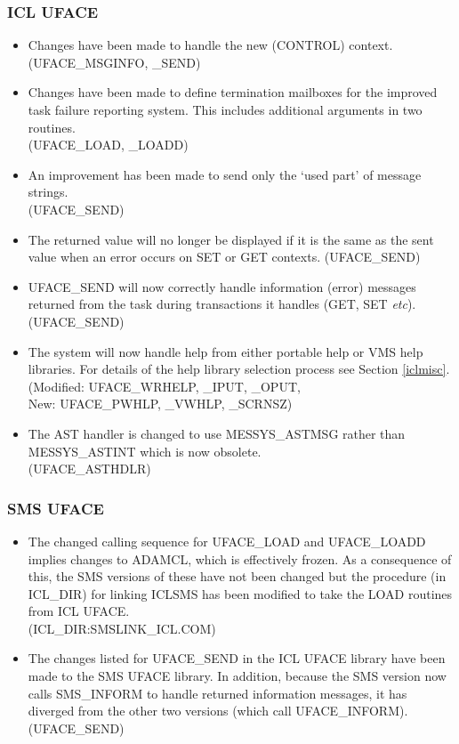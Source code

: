 \subsubsection{ICL UFACE}
\label{uface}
\begin{itemize}
\item Changes have been made to handle the new (CONTROL) context.\\
(UFACE\_MSGINFO, \_SEND)
\item Changes have been made to define termination mailboxes for the improved 
task failure reporting system. This includes additional arguments in two
routines.\\
(UFACE\_LOAD, \_LOADD)
\item An improvement has been made to send only the `used part' of message
strings.\\
(UFACE\_SEND)
\item The returned value will no longer be displayed if it is the same as
the sent value when an error occurs on SET or GET contexts. 
(UFACE\_SEND)
\item UFACE\_SEND will now correctly handle information (error) messages 
returned from the task during transactions it handles (GET, SET {\em etc}).\\
(UFACE\_SEND)
\item The system will now handle help from either portable help or VMS help
libraries. For details of the help library selection process see Section 
\ref{iclmisc}.\\
(Modified: UFACE\_WRHELP, \_IPUT, \_OPUT,\\ 
New: UFACE\_PWHLP, \_VWHLP, \_SCRNSZ)
\item The AST handler is changed to use MESSYS\_ASTMSG rather than 
MESSYS\_ASTINT which is now obsolete.\\
(UFACE\_ASTHDLR)
\end{itemize}
\subsubsection{SMS UFACE}
\begin{itemize}
\item The changed calling sequence for UFACE\_LOAD and UFACE\_LOADD implies
changes to ADAMCL, which is effectively frozen.
As a consequence of this, the SMS versions of these have not been changed but
the procedure (in ICL\_DIR) for linking 
ICLSMS has been modified to take the LOAD routines from ICL UFACE.\\
(ICL\_DIR:SMSLINK\_ICL.COM)
\item The changes listed for UFACE\_SEND in the ICL UFACE library have been
made to the SMS UFACE library. In addition, because the SMS version now 
calls SMS\_INFORM to handle returned information messages, it has diverged from
the other two versions (which call UFACE\_INFORM).\\
(UFACE\_SEND)
\end{itemize}
